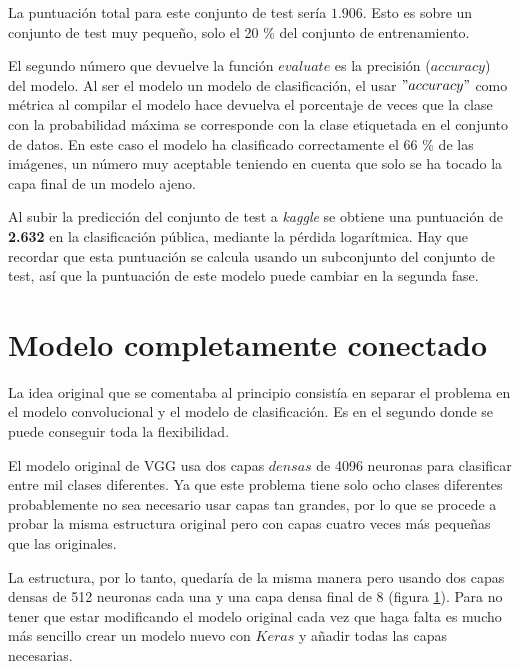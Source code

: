 La puntuación total para este conjunto de test sería $1.906$. Esto es sobre un conjunto de test muy pequeño, solo el 20 \% del conjunto de entrenamiento. 

El segundo número que devuelve la función $evaluate$ es la precisión ($accuracy$) del modelo. Al ser el modelo un modelo de clasificación, el usar $"accuracy"$ como métrica al compilar el modelo hace devuelva el porcentaje de veces que la clase con la probabilidad máxima se corresponde con la clase etiquetada en el conjunto de datos. En este caso el modelo ha clasificado correctamente el 66 \% de las imágenes, un número muy aceptable teniendo en cuenta que solo se ha tocado la capa final de un modelo ajeno.

Al subir la predicción del conjunto de test a \textit{kaggle} se obtiene una puntuación de \textbf{2.632} en la clasificación pública, mediante la pérdida logarítmica. Hay que recordar que esta puntuación se calcula usando un subconjunto del conjunto de test, así que la puntuación de este modelo puede cambiar en la segunda fase.


\section{Modelo completamente conectado}

La idea original que se comentaba al principio consistía en separar el problema en el modelo convolucional y el modelo de clasificación. Es en el segundo donde se puede conseguir toda la flexibilidad.

El modelo original de VGG usa dos capas $densas$ de 4096 neuronas para clasificar entre mil clases diferentes. Ya que este problema tiene solo ocho clases diferentes probablemente no sea necesario usar capas tan grandes, por lo que se procede a probar la misma estructura original pero con capas cuatro veces más pequeñas que las originales.

La estructura, por lo tanto, quedaría de la misma manera pero usando dos capas
densas de 512 neuronas cada una y una capa densa final de 8 (figura \ref{standard_arch}). Para no tener que
estar modificando el modelo original cada vez que haga falta es mucho más
sencillo crear un modelo nuevo con $Keras$ y añadir todas las capas necesarias.

\begin{figure}
  \caption{}
\label{standard_arch}
\end{figure}



